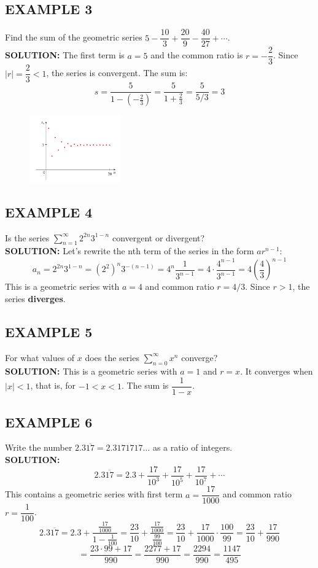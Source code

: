 \documentclass{article}
\begin{document}
\subsection*{EXAMPLE 3}
Find the sum of the geometric series \( 5 - \dfrac{10}{3} + \dfrac{20}{9} - \dfrac{40}{27} + \cdots \).\\
\textbf{SOLUTION:}
The first term is \(a = 5\) and the common ratio is \(r = -\dfrac{2}{3}\). Since \(|r| = \dfrac{2}{3} < 1\), the series is convergent. The sum is:
\[ s = \dfrac{5}{1 - (-\frac{2}{3})} = \dfrac{5}{1 + \frac{2}{3}} = \dfrac{5}{5/3} = 3 \]
\begin{figure}[htbp]
    \centering
    \includegraphics[width=0.35\textwidth]{graph72.png}
\end{figure}

\subsection*{EXAMPLE 4}
Is the series \( \sum_{n=1}^{\infty} 2^{2n} 3^{1-n} \) convergent or divergent?\\
\textbf{SOLUTION:}
Let's rewrite the nth term of the series in the form \(ar^{n-1}\):
\[ a_n = 2^{2n} 3^{1-n} = (2^2)^n 3^{-(n-1)} = 4^n \dfrac{1}{3^{n-1}} = 4 \cdot \dfrac{4^{n-1}}{3^{n-1}} = 4 \left( \dfrac{4}{3} \right)^{n-1} \]
This is a geometric series with \(a=4\) and common ratio \(r = 4/3\). Since \(r > 1\), the series \textbf{diverges}.

\subsection*{EXAMPLE 5}
For what values of \(x\) does the series \( \sum_{n=0}^{\infty} x^n \) converge?\\
\textbf{SOLUTION:}
This is a geometric series with \(a=1\) and \(r=x\). It converges when \(|x|<1\), that is, for \(-1 < x < 1\). The sum is \(\dfrac{1}{1-x}\).

\subsection*{EXAMPLE 6}
Write the number \(2.3\overline{17} = 2.3171717\dots\) as a ratio of integers.\\
\textbf{SOLUTION:}
\[ 2.3\overline{17} = 2.3 + \dfrac{17}{10^3} + \dfrac{17}{10^5} + \dfrac{17}{10^7} + \cdots \]
This contains a geometric series with first term \(a = \dfrac{17}{1000}\) and common ratio \(r = \dfrac{1}{100}\).
\[ 2.3\overline{17} = 2.3 + \dfrac{\frac{17}{1000}}{1 - \frac{1}{100}} = \dfrac{23}{10} + \dfrac{\frac{17}{1000}}{\frac{99}{100}} = \dfrac{23}{10} + \dfrac{17}{1000} \cdot \dfrac{100}{99} = \dfrac{23}{10} + \dfrac{17}{990} \]
\[ = \dfrac{23 \cdot 99 + 17}{990} = \dfrac{2277 + 17}{990} = \dfrac{2294}{990} = \dfrac{1147}{495} \]
\end{document}
